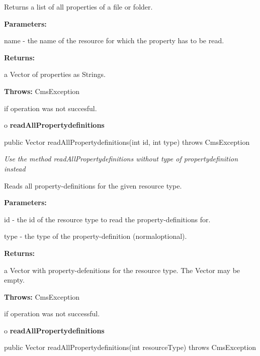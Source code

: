 \begin{description}
\htmlDD Returns a list of all properties of a file or folder.

\begin{description}
\item {\bf Parameters:}

name - the name of the resource for which the property has to be read.
\item {\bf Returns:}

a Vector of properties as Strings.
\item {\bf Throws:} CmsException

if operation was not succesful.
\end{description}

\end{description}

o {\bf readAllPropertydefinitions}

\begin{PRE}
 public Vector readAllPropertydefinitions(int id,
                                          int type) throws CmsException
\end{PRE}

\begin{description}
 {\it Use the
method readAllPropertydefinitions without type of propertydefinition instead}

Reads all property-definitions for the given resource type.

\begin{description}
\item {\bf Parameters:}

id - the id of the resource type to read the property-definitions for.

type - the type of the property-definition (normal{\htmlBar}optional).
\item {\bf Returns:}

a Vector with property-defenitions for the resource type. The Vector may be
empty.
\item {\bf Throws:} CmsException

if operation was not successful.
\end{description}

\end{description}

o {\bf readAllPropertydefinitions}

\begin{PRE}
 public Vector readAllPropertydefinitions(int resourceType) throws CmsException
\end{PRE}

